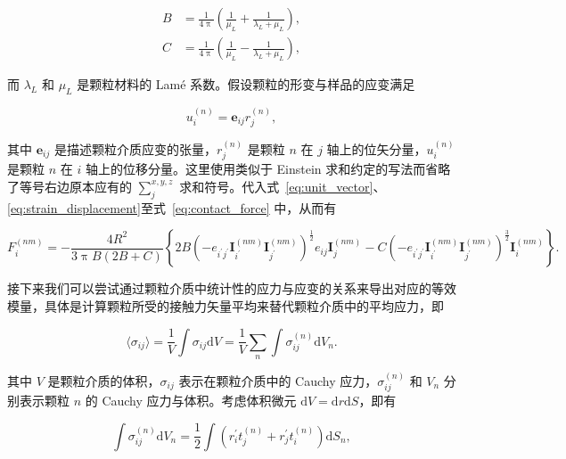 \begin{align}
  B &= \frac{1}{4\uppi}\left(\frac{1}{\mu_{L}} + \frac{1}{\lambda_{L} + \mu_{L}}\right),\\
  C &= \frac{1}{4\uppi}\left(\frac{1}{\mu_{L}} - \frac{1}{\lambda_{L} + \mu_{L}}\right),
\end{align}

而 $\lambda_{L}$ 和 $\mu_{L}$ 是颗粒材料的 Lamé 系数。假设颗粒的形变与样品的应变满足

\begin{equation}
  {u}_{i}^{(n)} = \mathbf{e}_{ij}{r}_{j}^{(n)}\label{eq:strain_displacement},
\end{equation}

其中 $\mathbf{e}_{ij}$ 是描述颗粒介质应变的张量，${r}_{j}^{(n)}$ 是颗粒 $n$ 在 $j$ 轴上的位矢分量，${u}_{i}^{(n)}$ 是颗粒 $n$ 在 $i$ 轴上的位移分量。这里使用类似于 Einstein 求和约定的写法而省略了等号右边原本应有的 $\sum_{j}^{x,y,z}$ 求和符号。代入式~\eqref{eq:unit_vector}、\eqref{eq:strain_displacement}至式~\eqref{eq:contact_force} 中，从而有

\begin{equation}
  F_{i}^{(nm)} = -\frac{4R^{2}}{3\uppi B(2B+C)}\left\{2B\left(-e_{i^{\prime}j^{\prime}}\mathbf{I}_{i^{\prime}}^{(nm)}\mathbf{I}_{j^{\prime}}^{(nm)}\right)^{\frac{1}{2}}e_{ij}\mathbf{I}_{j}^{(nm)} - C\left(-e_{i^{\prime}j^{\prime}}\mathbf{I}^{(nm)}_{i^{\prime}}\mathbf{I}_{j^{\prime}}^{(nm)}\right)^{\frac{3}{2}}\mathbf{I}_{i}^{(nm)}\right\}.
\end{equation}


接下来我们可以尝试通过颗粒介质中统计性的应力与应变的关系来导出对应的等效模量，具体是计算颗粒所受的接触力矢量平均来替代颗粒介质中的平均应力，即

\begin{equation}
  \langle\sigma_{ij}\rangle = \frac{1}{V}\int\sigma_{ij}\mathrm{d}V = \frac{1}{V}\sum_{n}\int\sigma_{ij}^{(n)}\mathrm{d}V_{n}.
\end{equation}

其中 $V$ 是颗粒介质的体积，$\sigma_{ij}$ 表示在颗粒介质中的 Cauchy 应力，$\sigma_{ij}^{(n)}$ 和 $V_{n}$ 分别表示颗粒 $n$ 的 Cauchy 应力与体积。考虑体积微元 $\mathrm{d}V = \mathrm{d}r\mathrm{d}S$，即有

\begin{equation}
  \int\sigma_{ij}^{(n)}\mathrm{d}V_{n} = \frac{1}{2}\int\left(r_{i}^{\prime}t_{j}^{(n)} + r_{j}^{\prime}t_{i}^{(n)}\right)\mathrm{d}S_{n},
\end{equation}

